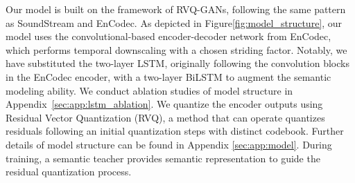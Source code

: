 Our model is built on the framework of RVQ-GANs, following the same pattern as SoundStream\citep{zeghidour2021soundstream}
 and EnCodec\citep{défossez2022high}. As depicted in Figure\ref{fig:model_structure}, our model uses the convolutional-based encoder-decoder network from EnCodec, which performs temporal downscaling with a chosen striding factor. Notably, we have substituted the two-layer LSTM, originally following the convolution blocks in the EnCodec encoder, with a two-layer BiLSTM to augment the semantic modeling ability. We conduct ablation studies of model structure in Appendix~\ref{sec:app:lstm_ablation}. We quantize the encoder outputs using Residual Vector Quantization (RVQ), a method that can operate quantizes residuals following an initial quantization steps with distinct codebook. Further details of model structure can be found in Appendix \ref{sec:app:model}. During training, a semantic teacher provides semantic representation to guide the residual quantization process. %

 

